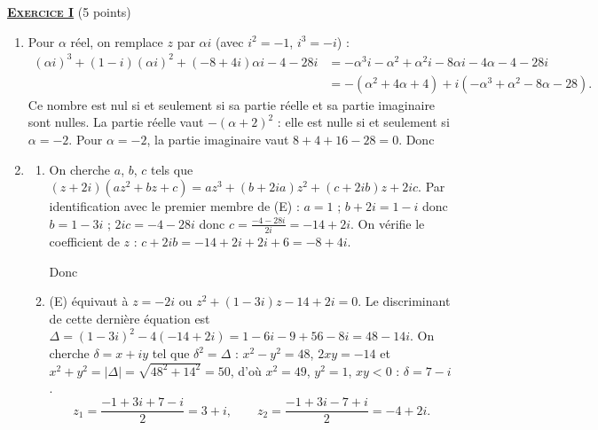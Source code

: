 \providecommand{\Courbe}{(\mathscr{C})}
\providecommand{\D}{(\mathscr{D})}
\providecommand{\Plan}{(\mathscr{P})}
\providecommand{\Ouv}{(O ; \vec{u} , \vec{v})}
\providecommand{\cm}{~\mathrm{cm}}
\providecommand{\dx}{~\mathrm{d}x}
%
\noindent \underline{\textsc{\textbf{Exercice I}}} (5 points)
	\begin{enumerate}
		\item {}
			Pour $\alpha$ réel, on remplace $z$ par $\alpha i$ (avec $i^2=-1$, $i^3=-i$) :
			\begin{align*}
				(\alpha i)^3 + (1-i)(\alpha i)^2 + (-8+4i)\alpha i - 4 - 28i
				&= -\alpha^3 i - \alpha^2 + \alpha^2 i - 8\alpha i - 4\alpha - 4 - 28i \\
				&= -\left(\alpha^2 + 4\alpha + 4\right) + i\left(-\alpha^3 + \alpha^2 - 8\alpha - 28\right).
			\end{align*}
			Ce nombre est nul si et seulement si sa partie réelle et sa partie imaginaire sont nulles.
			La partie réelle vaut $-(\alpha+2)^2$ : elle est nulle si et seulement si $\alpha = -2$.
			Pour $\alpha=-2$, la partie imaginaire vaut $8 + 4 + 16 - 28 = 0$.
			Donc 
		\item \begin{enumerate}
			\item {}
				On cherche $a$, $b$, $c$ tels que $(z+2i)(az^2+bz+c) = az^3 + (b+2ia)z^2 + (c+2ib)z + 2ic$.
				Par identification avec le premier membre de (E) :
				$a = 1$ ; $b + 2i = 1 - i$ donc $b = 1-3i$ ; $2ic = -4-28i$ donc $c = \frac{-4-28i}{2i} = -14 + 2i$.
				On vérifie le coefficient de $z$ : $c + 2ib = -14 + 2i + 2i + 6 = -8 + 4i$. \checkmark

				Donc 
			\item {}
				(E) équivaut à $z = -2i$ ou $z^2 + (1-3i)z - 14 + 2i = 0$.
				Le discriminant de cette dernière équation est
				$\Delta = (1-3i)^2 - 4(-14+2i) = 1 - 6i - 9 + 56 - 8i = 48 - 14i$.
				On cherche $\delta = x + iy$ tel que $\delta^2 = \Delta$ :
				$x^2 - y^2 = 48$, $2xy = -14$ et $x^2+y^2 = |\Delta| = \sqrt{48^2+14^2} = 50$,
				d'où $x^2 = 49$, $y^2 = 1$, $xy<0$ : $\delta = 7 - i$.
				\[
					z_1 = \frac{-1+3i + 7 - i}{2} = 3 + i, \qquad z_2 = \frac{-1+3i-7+i}{2} = -4+2i.
				\]


\end{enumerate}
\end{enumerate}
